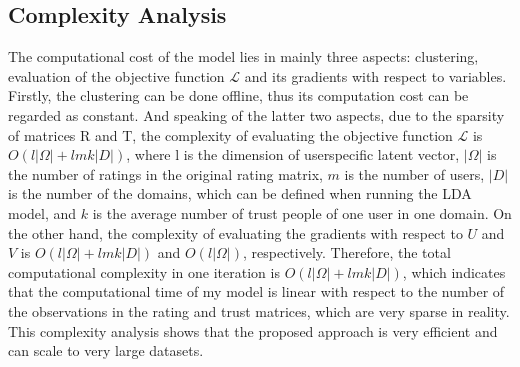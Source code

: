 \subsection{Complexity Analysis}
The computational cost of the model lies in mainly three aspects: clustering, evaluation of the objective function $\mathcal{L}$ and its gradients with respect to variables. Firstly, the clustering can be done offline, thus its computation cost can be regarded as constant. And speaking of the latter two aspects, due to the sparsity of matrices R and T, the complexity of evaluating the objective function $\mathcal{L}$ is $O(l|\Omega| + lmk|D|)$, where l is the dimension of user\-specific latent vector, $|\Omega|$ is the number of ratings in the original rating matrix, $m$ is the number of users, $|D|$ is the number of the domains, which can be defined when running the LDA model, and $k$ is the average number of trust people of one user in one domain. On the other hand, the complexity of evaluating the gradients with respect to $U$ and $V$ is  $O(l|\Omega| + lmk|D|)$ and $O(l|\Omega|)$, respectively. Therefore, the total computational complexity in one iteration is $O(l|\Omega| + lmk|D|)$, which indicates that the computational time of my model is linear with respect to the number of the observations in the rating and trust matrices, which are very sparse in reality. This complexity analysis shows that the proposed approach is very efficient and can scale to very large datasets.





